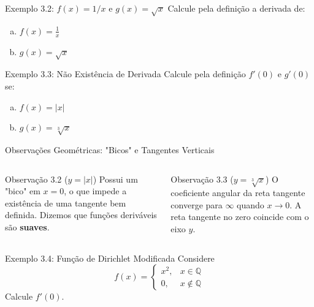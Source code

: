 \documentclass[10pt, aspectratio=169]{beamer}
\begin{document}
\begin{frame}{Exemplo 3.2: $f(x) = 1/x$ e $g(x) = \sqrt{x}$}
  Calcule pela definição a derivada de:
  
  \vspace{0.3cm}
  \begin{enumerate}[(a)]
    \item $f(x) = \frac{1}{x}$
    \vspace{2cm}
    \item $g(x) = \sqrt{x}$
  \end{enumerate}
\end{frame}

\begin{frame}{Exemplo 3.3: Não Existência de Derivada}
  Calcule pela definição $f'(0)$ e $g'(0)$ se:
  
  \vspace{0.3cm}
  \begin{enumerate}[(a)]
    \item $f(x) = |x|$
    \vspace{2cm}
    \item $g(x) = \sqrt[3]{x}$
  \end{enumerate}
\end{frame}

\begin{frame}{Observações Geométricas: "Bicos" e Tangentes Verticais}
  \begin{columns}
      \begin{block}{Observação 3.2 ($y = |x|$)}
        Possui um "bico" em $x=0$, o que impede a existência de uma tangente bem definida. Dizemos que funções deriváveis são \textbf{suaves}.
      \end{block}
      \begin{block}{Observação 3.3 ($y = \sqrt[3]{x}$)}
        O coeficiente angular da reta tangente converge para $\infty$ quando $x \to 0$. A reta tangente no zero coincide com o eixo $y$.
      \end{block}
  \end{columns}
\end{frame}

\begin{frame}{Exemplo 3.4: Função de Dirichlet Modificada}
  Considere 
  \[
    f(x) = \begin{cases} x^2, & x \in \mathbb{Q} \\ 0, & x \notin \mathbb{Q} \end{cases}
  \]
  Calcule $f'(0)$.
\end{frame}
\end{document}
